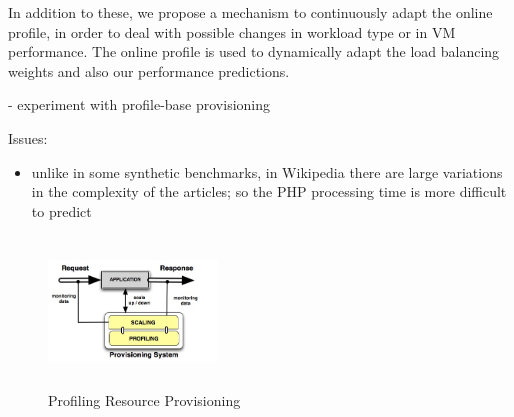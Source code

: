 In addition to these, we propose a mechanism to continuously adapt the online profile,
in order to deal with possible changes in workload type or in VM performance.
The online profile is used to dynamically adapt the load balancing weights and
also our performance predictions.

- experiment with profile-base provisioning


Issues:
\begin{itemize}
\item unlike in some synthetic benchmarks, in Wikipedia there are large variations
in the complexity of the articles; so the PHP processing time is more difficult 
to predict
\end{itemize}

\begin{figure}
\begin{center}
\includegraphics[width=0.4\textwidth, height=4cm]{./images/monitoringSchema.jpg}
\end{center}
\caption{Profiling Resource Provisioning}
\end{figure}
